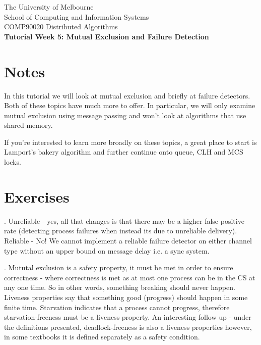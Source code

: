 \documentclass[12pt]{article}
\newcounter{question}
\newcommand{\question}[1]{
    \stepcounter{question}
    \thequestion. #1 \hfill
}
\begin{document}
\begin{center}
    {\sc The University of Melbourne
        \\
        School of Computing and Information Systems
        \\
    COMP90020 Distributed Algorithms}
    \bigskip \\
    {\Large\bf Tutorial Week 5: Mutual Exclusion and Failure Detection}
    \bigskip \\
\end{center}

\section*{Notes}

In this tutorial we will look at mutual exclusion and briefly at failure detectors. Both of these topics have much more to offer. In particular, we will only examine mutual exclusion using message passing and won't look at algorithms that use shared memory.

If you're interested to learn more broadly on these topics, a great place to start is Lamport's bakery algorithm and further continue onto queue, CLH and MCS locks.


\section*{Exercises}

\setcounter{question}{17}

\question{Unreliable - yes, all that changes is that there may be a higher false positive rate (detecting process failures when instead its due to unreliable delivery). Reliable - No! We cannot implement a reliable failure detector on either channel type without an upper bound on message delay i.e. a sync system.}

\question{Mututal exclusion is a safety property, it must be met in order to ensure correctness - where correctness is met as at most one process can be in the CS at any one time. So in other words, something breaking should never happen. Liveness properties say that something good (progress) should happen in some finite time. Starvation indicates that a process cannot progress, therefore starvation-freeness must be a liveness property. An interesting follow up - under the definitions presented, deadlock-freeness is also a liveness properties however, in some textbooks it is defined separately as a safety condition.}
\end{document}
